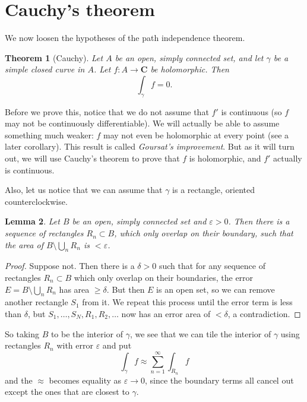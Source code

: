 \documentclass[12pt]{report}
\newcommand{\CC}{\mathbf{C}}
\newcommand{\dfn}[1]{\emph{#1}\index{#1}}
\newtheorem{theorem}{Theorem}[chapter]
\newtheorem{lemma}[theorem]{Lemma}
\theoremstyle{definition}
\theoremstyle{remark}
\begin{document}
\section{Cauchy's theorem}
We now loosen the hypotheses of the path independence theorem.

\begin{theorem}[Cauchy]
Let $A$ be an open, simply connected set, and let $\gamma$ be a simple closed curve in $A$. Let $f: A \to \CC$ be holomorphic. Then
$$\int_\gamma f = 0.$$
\end{theorem}
Before we prove this, notice that we do not assume that $f'$ is continuous (so $f$ may not be continuously differentiable). We will actually be able to assume something much weaker: $f$ may not even be holomorphic at every point (see a later corollary). This result is called \dfn{Goursat's improvement}. But as it will turn out, we will use Cauchy's theorem to prove that $f$ is holomorphic, and $f'$ actually is continuous.

Also, let us notice that we can assume that $\gamma$ is a rectangle, oriented counterclockwise.
\begin{lemma}
Let $B$ be an open, simply connected set and $\varepsilon > 0$. Then there is a sequence of rectangles $R_n \subset B$, which only overlap on their boundary, such that the area of $B \setminus \bigcup_n R_n$ is $< \varepsilon$.
\end{lemma}
\begin{proof}
Suppose not. Then there is a $\delta > 0$ such that for any sequence of rectangles $R_n \subset B$ which only overlap on their boundaries, the error $E = B \setminus \bigcup_n R_n$ has area $\geq \delta$. But then $E$ is an open set, so we can remove another rectangle $S_1$ from it. We repeat this process until the error term is less than $\delta$, but $S_1, \dots, S_N, R_1, R_2, \dots$ now has an error area of $< \delta$, a contradiction.
\end{proof}

So taking $B$ to be the interior of $\gamma$, we see that we can tile the interior of $\gamma$ using rectangles $R_n$ with error $\varepsilon$ and put
$$\int_\gamma f \approx \sum_{n=1}^\infty \int_{R_n} f$$
and the $\approx$ becomes equality as $\varepsilon \to 0$, since the boundary terms all cancel out except the ones that are closest to $\gamma$.
\end{document}
